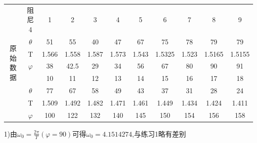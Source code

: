 \documentclass[UTF8]{ctexart}
\begin{document}
        \begin{table}[!htbp]
            \centering
            \begin{tabular}{|c|c|c|c|c|c|c|c|c|c|c|}
            \hline
            \multirow{8}{*}{原始数据} & 阻尼4       & 1     & 2     & 3     & 4     & 5     & 6      & 7     & 8      & 9      \\ \cline{2-11}
                                  & $\theta$  & 51    & 55    & 40    & 47    & 67    & 75     & 78    & 79     & 79     \\ \cline{2-11}
                                  & T         & 1.566 & 1.558 & 1.587 & 1.573 & 1.543 & 1.5325 & 1.523 & 1.5165 & 1.5155 \\ \cline{2-11}
                                  & $\varphi$ & 38    & 42.5  & 29    & 34    & 56    & 67     & 80    & 90     & 91     \\ \cline{2-11}
                                  &           & 10    & 11    & 12    & 13    & 14    & 15     & 16    & 17     & 18     \\ \cline{2-11}
                                  & $\theta$  & 77    & 67    & 58    & 49    & 43    & 37     & 31    & 28     & 24     \\ \cline{2-11}
                                  & T         & 1.509 & 1.492 & 1.482 & 1.471 & 1.461 & 1.449  & 1.434 & 1.424  & 1.411  \\ \cline{2-11}
                                  & $\varphi$ & 100   & 122   & 132   & 140   & 145   & 150    & 154   & 156    & 158    \\ \hline
            \end{tabular}
        \end{table}

        1)由$\omega_{0}=\frac{2\pi}{T}(\varphi=90)$可得$\omega_{0}=4.1514274$,与练习1略有差别
\end{document}
